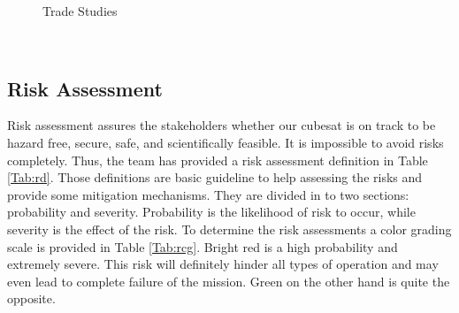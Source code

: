 \begin{figure}[h!]
  \caption{Trade Studies}
  \label{fig:graph}
\end{figure}\\

\subsection {Risk Assessment}
Risk assessment assures the stakeholders whether our cubesat  is on track to be hazard free, secure, safe, and scientifically feasible. It is impossible to avoid risks completely. Thus, the team has provided a risk assessment definition in Table \ref{Tab:rd}. Those definitions are basic guideline to help assessing the risks and provide some mitigation mechanisms. They are divided in to two sections: probability and severity. Probability is the likelihood of risk to occur, while severity is the effect of the risk. To determine the risk assessments a color grading scale is provided in Table \ref{Tab:rcg}. Bright red is a high probability  and extremely severe. This risk will definitely hinder all types of operation and may even lead to complete failure of the mission. Green on the other hand is quite the opposite.\\

